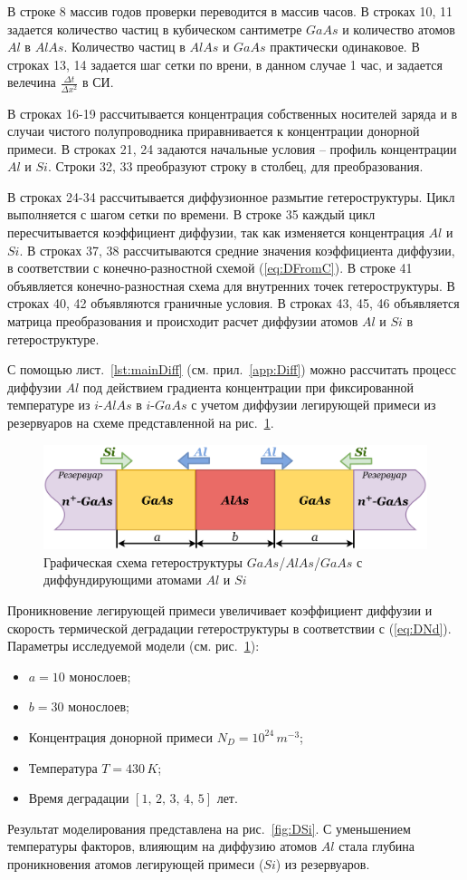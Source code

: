 В строке 8 массив годов проверки переводится в массив часов. В строках 10, 11 задается количество частиц в кубическом сантиметре $GaAs$ и количество атомов $Al$ в $AlAs$. Количество частиц в $AlAs$ и $GaAs$ практически одинаковое. В строках 13, 14 задается шаг сетки по врени, в данном случае 1 час, и задается велечина $\frac{\Delta t}{\Delta x^{2}}$ в СИ.

В строках 16-19 рассчитывается концентрация собственных носителей заряда и в случаи чистого полупроводника приравнивается к концентрации донорной примеси. В строках 21, 24 задаются начальные условия -- профиль концентрации $Al$ и $Si$. Строки 32, 33 преобразуют строку в столбец, для преобразования. 

В строках 24-34 рассчитывается диффузионное размытие гетероструктуры. Цикл выполняется с шагом сетки по времени. В строке 35 каждый цикл пересчитывается коэффициент диффузии, так как изменяется концентрация $Al$ и $Si$. В строках 37, 38 рассчитываются средние значения коэффициента диффузии, в соответствии с конечно-разностной схемой (\ref{eq:DFromC}). В строке 41 объявляется конечно-разностная схема для внутренних точек гетероструктуры. В строках 40, 42 объявляются граничные условия. В строках 43, 45, 46 объявляется матрица преобразования и происходит расчет диффузии атомов $Al$ и $Si$ в гетероструктуре.

С помощью лист.~\ref{lst:mainDiff} (см. прил.~\ref{app:Diff}) можно рассчитать процесс диффузии $Al$ под действием градиента концентрации при фиксированной температуре из $i$-$AlAs$ в $i$-$GaAs$ с учетом диффузии легирующей примеси из резервуаров на схеме представленной на рис.~\ref{fig:DSiBox}.
\begin{figure}[h!]
	\centering
	\includegraphics[width=0.8\linewidth]{assets/DSiBox}
	\caption{Графическая схема гетероструктуры $GaAs$/$AlAs$/$GaAs$ с диффундирующими атомами $Al$ и $Si$}
	\label{fig:DSiBox}
\end{figure}

Проникновение легирующей примеси увеличивает коэффициент диффузии и скорость термической деградации гетероструктуры в соответствии с (\ref{eq:DNd}). Параметры исследуемой модели (см. рис.~\ref{fig:DSiBox}):
\begin{itemize}
	\item $a = 10$ монослоев;
	\item $b = 30$ монослоев;
	\item Концентрация донорной примеси $N_{D} = 10^{24}\,m^{-3}$;
	\item Температура $T = 430\,K$;
	\item Время деградации $[1,\,2,\,3,\,4,\,5]$ лет.
\end{itemize}
Результат моделирования представлена на рис.~\ref{fig:DSi}. С уменьшением температуры факторов, влияющим на диффузию атомов $Al$ стала глубина проникновения атомов легирующей примеси ($Si$) из резервуаров.

